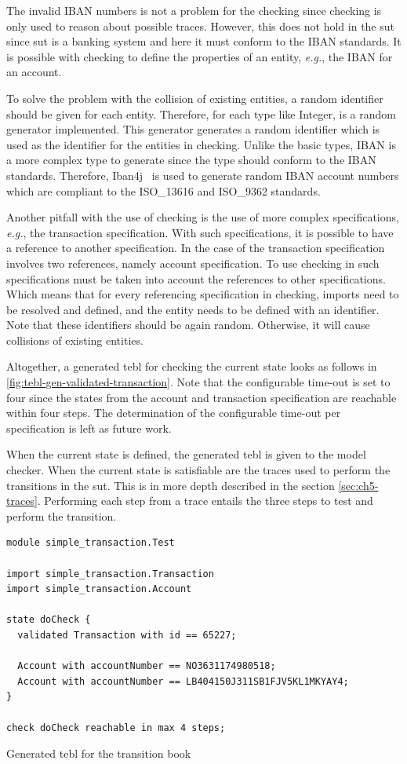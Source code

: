 The invalid IBAN numbers is not a problem for the
checking since checking is only used to reason about possible traces. However,
this does not hold in the \gls{sut} since \gls{sut} is a banking system and here it must
conform to the IBAN standards. It is possible with checking to define the
properties of an entity, \textit{e.g.}, the IBAN for an account.

To solve the
problem with the collision of existing entities, a random identifier should be
given for each entity. Therefore, for each type like Integer, is a random
generator implemented. This generator generates a random identifier which is
used as the identifier for the entities in checking. Unlike the basic types,
IBAN is a more complex type to generate since the type should conform to the
IBAN standards. Therefore, Iban4j~\cite{iban4j} is used to generate random IBAN
account numbers which are compliant to the ISO\_13616 and ISO\_9362 standards.

Another pitfall with the use of checking is the use of more complex
specifications, \textit{e.g.}, the transaction specification. With such
specifications, it is possible to have a reference to another specification. In
the case of the transaction specification involves two references, namely
account specification. To use checking in such specifications must be taken into
account the references to other specifications. Which means that for every
referencing specification in checking, imports need to be resolved and defined,
and the entity needs to be defined with an identifier. Note that these
identifiers should be again random. Otherwise, it will cause collisions of
existing entities.

Altogether, a generated tebl for checking the current state looks as follows in
\autoref{fig:tebl-gen-validated-transaction}. Note that the configurable
time-out is set to four since the states from the account and transaction
specification are reachable within four steps. The determination of the
configurable time-out per specification is left as future work.

When the current state is defined, the generated tebl is given to the model
checker. When the current state is satisfiable are the traces used to perform
the transitions in the \gls{sut}. This is in more depth described in the section
\autoref{sec:ch5-traces}. Performing each step from a trace entails the three
steps to test and perform the transition.

\begin{sourcecode}[h!]
\begin{lstlisting}[]
module simple_transaction.Test

import simple_transaction.Transaction
import simple_transaction.Account

state doCheck {
  validated Transaction with id == 65227;

  Account with accountNumber == NO3631174980518;
  Account with accountNumber == LB404150J311SB1FJV5KL1MKYAY4;
}

check doCheck reachable in max 4 steps;
\end{lstlisting}
\caption{Generated tebl for the transition book}\label{fig:tebl-gen-validated-transaction}
\end{sourcecode}
\FloatBarrier

